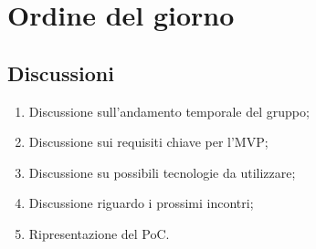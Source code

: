 \section{Ordine del giorno} 
\label{sec:agenda}
\subsection{Discussioni} 
\label{subsec:discussione}
\begin{enumerate}
    \item Discussione sull'andamento temporale del gruppo;
    \item Discussione sui requisiti chiave per l'MVP;
    \item Discussione su possibili tecnologie da utilizzare;
    \item Discussione riguardo i prossimi incontri;
    \item Ripresentazione del PoC.
\end{enumerate}
